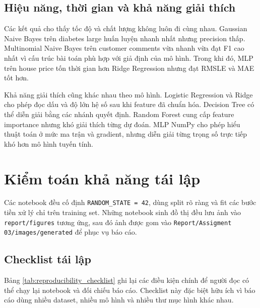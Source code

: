 \documentclass[12pt,a4paper]{report}
\newcommand{\modelpath}[1]{\texttt{#1}}
\begin{document}
\subsection{Hiệu năng, thời gian và khả năng giải thích}
Các kết quả cho thấy tốc độ và chất lượng không luôn đi cùng nhau.
Gaussian Naive Bayes trên diabetes large huấn luyện nhanh nhất nhưng precision thấp.
Multinomial Naive Bayes trên customer comments vừa nhanh vừa đạt F1 cao nhất vì cấu trúc bài toán phù hợp với giả định của mô hình.
Trong khi đó, MLP trên house price tốn thời gian hơn Ridge Regression nhưng đạt RMSLE và MAE tốt hơn.

Khả năng giải thích cũng khác nhau theo mô hình.
Logistic Regression và Ridge cho phép đọc dấu và độ lớn hệ số sau khi feature đã chuẩn hóa.
Decision Tree có thể diễn giải bằng các nhánh quyết định.
Random Forest cung cấp feature importance nhưng khó giải thích từng dự đoán.
MLP NumPy cho phép hiểu thuật toán ở mức ma trận và gradient, nhưng diễn giải từng trọng số trực tiếp khó hơn mô hình tuyến tính.

\section{Kiểm toán khả năng tái lập}
Các notebook đều cố định \texttt{RANDOM\_STATE = 42}, dùng split rõ ràng và fit các bước tiền xử lý chỉ trên training set. Những notebook sinh đồ thị đều lưu ảnh vào \modelpath{report/figures} tương ứng, sau đó ảnh được gom vào \modelpath{Report/Assigment 03/images/generated} để phục vụ báo cáo.

\subsection{Checklist tái lập}
Bảng \ref{tab:reproducibility_checklist} ghi lại các điều kiện chính để người đọc có thể chạy lại notebook và đối chiếu báo cáo.
Checklist này đặc biệt hữu ích vì báo cáo dùng nhiều dataset, nhiều mô hình và nhiều thư mục hình khác nhau.
\end{document}

